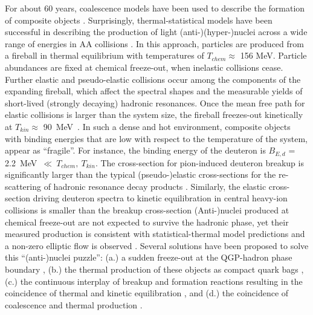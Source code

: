 \documentclass[%
 reprint,
 amsmath,amssymb,
 aps,
]{revtex4-1}
\begin{document}
For about 60 years, coalescence models have been used to describe the formation of composite objects \cite{Butler:1963, Kapusta:1980, Sato:1981ez, Nagle:1996vp, Scheibl:1998tk, Cho:2017dcy, Blum:2017qnn, Bazak:2018hgl, Zhao:2018lyf}.
Surprisingly, thermal-statistical models have been successful in describing the production of light \mbox{(anti-)}(hyper-)nuclei across a wide range of energies in AA collisions \cite{Andronic:2010qu,Andronic:2017}. 
In this approach, particles are produced from a fireball in thermal equilibrium with temperatures of $T_{chem} \approx$ 156 MeV.
Particle abundances are fixed at chemical freeze-out, when inelastic collisions cease. Further elastic and pseudo-elastic collisions occur among the components of the expanding fireball, which affect the spectral shapes and the measurable yields of short-lived (strongly decaying) hadronic resonances. 
Once the mean free path for elastic collisions is larger than the system size, the fireball freezes-out kinetically at $T_{kin} \approx$ 90~MeV~\cite{Abelev:2013vea}. 
In such a dense and hot environment, composite objects with binding energies that are low with respect to the temperature of the system, appear as ``fragile''. 
For instance, the binding energy of the deuteron is $B_{E, d}$ = 2.2~MeV~$\ll~T_{chem},~T_{kin}$.
The cross-section for pion-induced deuteron breakup is significantly larger than the typical (pseudo-)elastic cross-sections for the re-scattering of hadronic resonance decay products \cite{Garcilazo:1982yc, Bass:1998ca, Schukraft:2017nbn, Oliinychenko:2018ugs}. 
Similarly, the elastic cross-section driving deuteron spectra to kinetic equilibration in central heavy-ion collisions \cite{Acharya:2017dmc} is smaller than the breakup cross-section \cite{Garcilazo:1982yc, Bass:1998ca, Schukraft:2017nbn, Oliinychenko:2018ugs}   
(Anti-)nuclei produced at chemical freeze-out are not expected to survive the hadronic phase, yet their measured production is consistent with statistical-thermal model predictions and a non-zero elliptic flow is observed \cite{Acharya:2017dmc, Puccio:2019oyd}. 
Several solutions have been proposed to solve this ``(anti-)nuclei puzzle'': (a.) a sudden freeze-out at the QGP-hadron phase boundary \cite{Castorina:2019pnb}, (b.) the thermal production of these objects as compact quark bags \cite{Andronic:2017}, (c.) the continuous interplay of breakup and formation reactions resulting in the coincidence of thermal and kinetic equilibration \cite{Oliinychenko:2018ugs, Xu:2018jff}, 
and (d.) the coincidence of coalescence and thermal production \cite{Scheibl:1998tk, HeinzTorino}.
\end{document}

